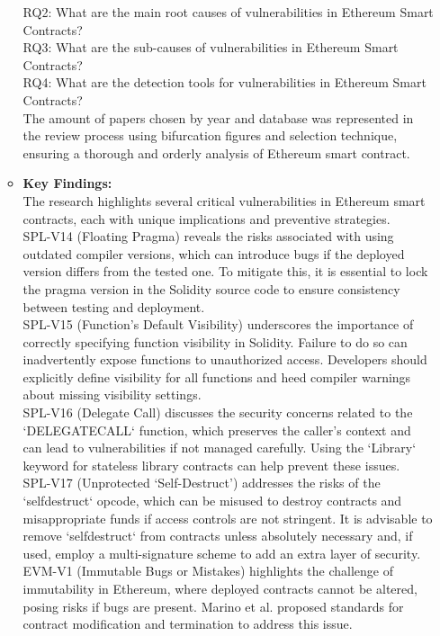 \documentclass[12pt,a4paper]{article}
\begin{document}
\begin{itemize}
\begin{itemize}
RQ2: What are the main root causes of vulnerabilities in Ethereum Smart Contracts?
\\
RQ3: What are the sub-causes of vulnerabilities in Ethereum Smart Contracts?
\\
RQ4: What are the detection tools for vulnerabilities in Ethereum Smart Contracts?
\\
The amount of papers chosen by year and database was represented in the review process using bifurcation figures and selection technique, ensuring a thorough and orderly analysis of Ethereum smart contract.
        \item \textbf{Key Findings:} \\
The research highlights several critical vulnerabilities in Ethereum smart contracts, each with unique implications and preventive strategies. 
\\
SPL-V14 (Floating Pragma) reveals the risks associated with using outdated compiler versions, which can introduce bugs if the deployed version differs from the tested one. To mitigate this, it is essential to lock the pragma version in the Solidity source code to ensure consistency between testing and deployment. 
\\
SPL-V15 (Function’s Default Visibility) underscores the importance of correctly specifying function visibility in Solidity. Failure to do so can inadvertently expose functions to unauthorized access. Developers should explicitly define visibility for all functions and heed compiler warnings about missing visibility settings. 
\\
SPL-V16 (Delegate Call) discusses the security concerns related to the `DELEGATECALL` function, which preserves the caller's context and can lead to vulnerabilities if not managed carefully. Using the `Library` keyword for stateless library contracts can help prevent these issues.
\\ 
SPL-V17 (Unprotected ‘Self-Destruct’) addresses the risks of the `selfdestruct` opcode, which can be misused to destroy contracts and misappropriate funds if access controls are not stringent. It is advisable to remove `selfdestruct` from contracts unless absolutely necessary and, if used, employ a multi-signature scheme to add an extra layer of security. 
\\ 
EVM-V1 (Immutable Bugs or Mistakes) highlights the challenge of immutability in Ethereum, where deployed contracts cannot be altered, posing risks if bugs are present. Marino et al. proposed standards for contract modification and termination to address this issue. 

\end{itemize}
\end{itemize}
\end{document}
